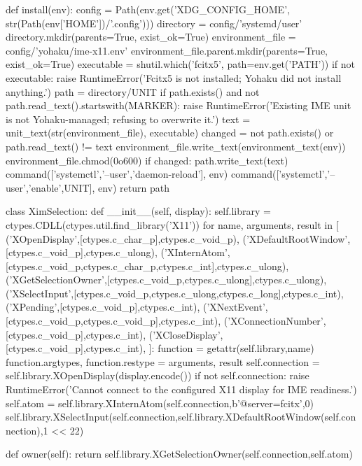 def install(env):
    config = Path(env.get('XDG_CONFIG_HOME', str(Path(env['HOME'])/'.config')))
    directory = config/'systemd/user'
    directory.mkdir(parents=True, exist_ok=True)
    environment_file = config/'yohaku/ime-x11.env'
    environment_file.parent.mkdir(parents=True, exist_ok=True)
    executable = shutil.which('fcitx5', path=env.get('PATH'))
    if not executable:
        raise RuntimeError('Fcitx5 is not installed; Yohaku did not install anything.')
    path = directory/UNIT
    if path.exists() and not path.read_text().startswith(MARKER):
        raise RuntimeError('Existing IME unit is not Yohaku-managed; refusing to overwrite it.')
    text = unit_text(str(environment_file), executable)
    changed = not path.exists() or path.read_text() != text
    environment_file.write_text(environment_text(env))
    environment_file.chmod(0o600)
    if changed:
        path.write_text(text)
        command(['systemctl','--user','daemon-reload'], env)
    command(['systemctl','--user','enable',UNIT], env)
    return path


class XimSelection:
    def __init__(self, display):
        self.library = ctypes.CDLL(ctypes.util.find_library('X11'))
        for name, arguments, result in [
            ('XOpenDisplay',[ctypes.c_char_p],ctypes.c_void_p),
            ('XDefaultRootWindow',[ctypes.c_void_p],ctypes.c_ulong),
            ('XInternAtom',[ctypes.c_void_p,ctypes.c_char_p,ctypes.c_int],ctypes.c_ulong),
            ('XGetSelectionOwner',[ctypes.c_void_p,ctypes.c_ulong],ctypes.c_ulong),
            ('XSelectInput',[ctypes.c_void_p,ctypes.c_ulong,ctypes.c_long],ctypes.c_int),
            ('XPending',[ctypes.c_void_p],ctypes.c_int),
            ('XNextEvent',[ctypes.c_void_p,ctypes.c_void_p],ctypes.c_int),
            ('XConnectionNumber',[ctypes.c_void_p],ctypes.c_int),
            ('XCloseDisplay',[ctypes.c_void_p],ctypes.c_int),
        ]:
            function = getattr(self.library,name)
            function.argtypes, function.restype = arguments, result
        self.connection = self.library.XOpenDisplay(display.encode())
        if not self.connection:
            raise RuntimeError('Cannot connect to the configured X11 display for IME readiness.')
        self.atom = self.library.XInternAtom(self.connection,b'@server=fcitx',0)
        self.library.XSelectInput(self.connection,self.library.XDefaultRootWindow(self.connection),1 << 22)

    def owner(self):
        return self.library.XGetSelectionOwner(self.connection,self.atom)

